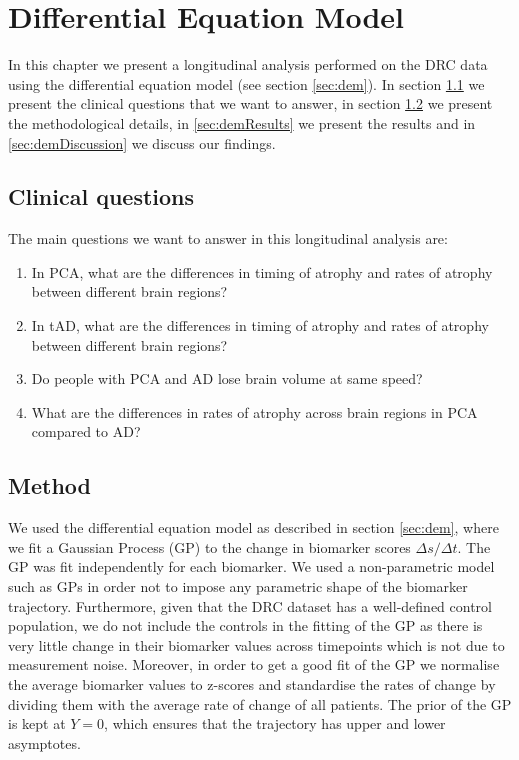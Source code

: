 \chapter{Differential Equation Model}
\label{chapter:diffeq}

In this chapter we present a longitudinal analysis performed on the DRC data using the differential equation model (see section \ref{sec:dem}). In section \ref{sec:demClinicalQuestions} we present the clinical questions that we want to answer, in section \ref{sec:demMethod} we present the methodological details, in \ref{sec:demResults} we present the results and in \ref{sec:demDiscussion} we discuss our findings. 



\section{Clinical questions}
\label{sec:demClinicalQuestions}

The main questions we want to answer in this longitudinal analysis are:
\begin{enumerate}
\item In PCA, what are the differences in timing of atrophy and rates of atrophy between different brain regions? 
\item In tAD, what are the differences in timing of atrophy and rates of atrophy between different brain regions? 
\item Do people with PCA and AD lose brain volume at same speed? 
\item What are the differences in rates of atrophy across brain regions in PCA compared to AD? 
\end{enumerate}

\section{Method}
\label{sec:demMethod}

We used the differential equation model as described in section \ref{sec:dem}, where we fit a Gaussian Process (GP) to the change in biomarker scores $\Delta s / \Delta t$. The GP was fit independently for each biomarker. We used a non-parametric model such as GPs in order not to impose any parametric shape of the biomarker trajectory. Furthermore, given that the DRC dataset has a well-defined control population, we do not include the controls in the fitting of the GP as there is very little change in their biomarker values across timepoints which is not due to measurement noise. Moreover, in order to get a good fit of the GP we normalise the average biomarker values to z-scores and standardise the rates of change by dividing them with the average rate of change of all patients. The prior of the GP is kept at $Y=0$, which ensures that the trajectory has upper and lower asymptotes. 

